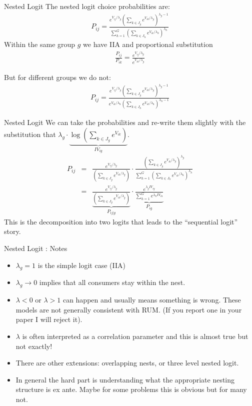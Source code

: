 \documentclass[xcolor=pdftex,dvipsnames,table,mathserif]{beamer}
\begin{document}
\begin{frame}{Nested Logit}
The nested logit choice probabilities are:
\begin{eqnarray*}
P_{ij} = \frac{ e^{V_{ij}/\lambda_g} \left(\sum_{k \in J_g} e^{V_{ik}/\lambda_g} \right)^{\lambda_g -1}}{\sum_{h=1}^G \left(\sum_{k \in J_h} e^{V_{ik}/\lambda_h} \right)^{\lambda_h}}
\end{eqnarray*}
Within the same group $g$ we have IIA and proportional substitution 
\begin{eqnarray*}
\frac{P_{ij}}{P_{ik}} = \frac{ e^{V_{ij}/\lambda_g}}{ e^{V_{ik}/\lambda_g}}
\end{eqnarray*}

But for different groups we do not:
\begin{eqnarray*}
P_{ij} = \frac{ e^{V_{ij}/\lambda_g} \left(\sum_{k \in J_g} e^{V_{ik}/\lambda_g} \right)^{\lambda_g -1}}{ e^{V_{ik}/\lambda_h} \left(\sum_{k \in J_h} e^{V_{ik}/\lambda_h} \right)^{\lambda_h -1}}
\end{eqnarray*}
\end{frame}


\begin{frame}{Nested Logit}
We can take the probabilities and re-write them slightly with the substitution that 
$\lambda_g \cdot \underbrace{\log \left(\sum_{k \in J_g} e^{V_{ik}} \right)}_{IV_{ig}}$.
\begin{eqnarray*}
P_{ij} &=& \frac{ e^{V_{ij}/\lambda_g}}{ \left(\sum_{k \in J_g} e^{V_{ik}/\lambda_g} \right)}
\cdot
\frac{ \left(\sum_{k \in J_g} e^{V_{ik}/\lambda_g} \right)^{\lambda_g}}{\sum_{h=1}^G \left(\sum_{k \in J_h} e^{V_{ik}/\lambda_h} \right)^{\lambda_h}} \\
&=& \underbrace{\frac{ e^{V_{ij}/\lambda_g}}{ \left(\sum_{k \in J_g} e^{V_{ik}/\lambda_g} \right)}}_{P_{i j | g}}
\cdot
\underbrace{\frac{e^{\lambda_g IV_{ig}}}{\sum_{h=1}^{G} e^{\lambda_h IV_{ih}} }}_{P_{ig}}
\end{eqnarray*}
This is the decomposition into two logits that leads to the ``sequential logit'' story.
\end{frame}

\begin{frame}{Nested Logit : Notes}
\begin{itemize}
\item $\lambda_g=1$ is the simple logit case (IIA)
\item $\lambda_g \rightarrow 0$ implies that all consumers stay within the nest.
\item $\lambda < 0$ or $\lambda > 1$ can happen and usually means something is wrong. These models are not generally consistent with RUM. (If you report one in your paper I will reject it).
\item $\lambda$ is often interpreted as a correlation parameter and this is almost true but not exactly!
\item There are other extensions: overlapping nests, or three level nested logit. 
\item In general the hard part is understanding what the appropriate nesting structure is ex ante. Maybe for some problems this is obvious but for many not.
\end{itemize}
\end{frame}
\end{document}
